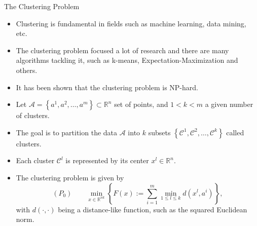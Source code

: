 \documentclass[9pt,handout]{beamer} %
\newcommand{\R}{\mathbb{R}} %
\begin{document}
\begin{frame}{The Clustering Problem}
    	\begin{itemize}[<+->]
    		\item Clustering is fundamental in fields such as machine learning, data mining, etc.
    		\item The clustering problem focused a lot of research and there are many algorithms tackling it, such as k-means, Expectation-Maximization and others.
    		\item It has been shown that the clustering problem is NP-hard.
    		\item Let $\mathcal{A}=\left\{ a^1, a^2, \ldots, a^m \right\} \subset \R^n$ set of points, and $1<k<m$ a given number of clusters.
    		\item The goal is to partition the data $\mathcal{A}$ into $k$ subsets $\left\{ \mathcal{C}^1, \mathcal{C}^2, \ldots, \mathcal{C}^k \right\}$ called clusters.
    		\item Each cluster $\mathcal{C}^l$ is represented by its center $x^l \in \R^n$.
    	
    		\item The clustering problem is given by
    			\begin{equation*}
    				(P_0) \qquad \min\limits_{x \in \R^{nk}} \left\{ F(x) := \sum\limits_{i=1}^{m} \min\limits_{1 \le l \le k} d(x^l,a^i) \right\} ,
				\end{equation*}
				with $\textit{d}(\cdot ,\cdot)$ being a distance-like function, such as the squared Euclidean norm.
		\end{itemize}
		
    \end{frame}
    
\end{document}
